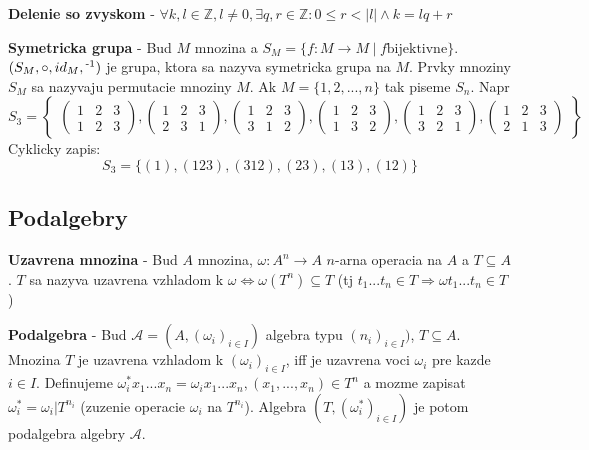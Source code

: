 \documentclass[12pt]{article}
\newcommand{\pipesep}{\hspace{3pt} \vert \hspace{3pt}}
\begin{document}
\textbf{Delenie so zvyskom} - $\forall k,l \in \mathbb{Z}, l \not= 0, \exists q,r \in \mathbb{Z}:
0 \le r < \vert l \vert \land k = lq + r$

\textbf{Symetricka grupa} - Bud $M$ mnozina a $S_{M} = \{ f : M \to M \pipesep f \text{bijektivne} \}$.
$(S_{M}, \circ, id_{M}, \textsuperscript{-1})$ je grupa, ktora sa nazyva symetricka grupa na $M$.
Prvky mnoziny $S_{M}$ sa nazyvaju permutacie mnoziny $M$. Ak $M = \{1,2,...,n\}$ tak piseme $S_{n}$. Napr
\begin{equation*}
	S_{3} = \begin{Bmatrix}
	\begin{pmatrix}
		1 & 2 & 3 \\
		1 & 2 & 3
	\end{pmatrix},
	\begin{pmatrix}
		1 & 2 & 3 \\
		2 & 3 & 1
	\end{pmatrix},
	\begin{pmatrix}
		1 & 2 & 3 \\
		3 & 1 & 2
	\end{pmatrix},
	\begin{pmatrix}
		1 & 2 & 3 \\
		1 & 3 & 2
	\end{pmatrix},
	\begin{pmatrix}
		1 & 2 & 3 \\
		3 & 2 & 1
	\end{pmatrix},
	\begin{pmatrix}
		1 & 2 & 3 \\
		2 & 1 & 3
	\end{pmatrix}
	\end{Bmatrix}
\end{equation*}
Cyklicky zapis:
\begin{equation*}
	S_{3} = \{ (1), (123), (312), (23), (13), (12) \}
\end{equation*}
\subsection{Podalgebry}
\textbf{Uzavrena mnozina} - Bud $A$ mnozina, $\omega: A^{n} \to A$ $n$-arna operacia na $A$ a $T \subseteq A$.
$T$ sa nazyva uzavrena vzhladom k $\omega \Leftrightarrow \omega(T^{n}) \subseteq T$
(tj $t_{1}...t_{n} \in T \Rightarrow \omega t_{1}...t_{n} \in T$)

\textbf{Podalgebra} - Bud $\mathcal{A} = (A,(\omega_{i})_{i \in I})$ algebra typu $(n_{i})_{i \in I})$, $T \subseteq A$.
Mnozina $T$ je uzavrena vzhladom k $(\omega_{i})_{i \in I}$, iff je uzavrena voci $\omega_{i}$ pre kazde $i \in I$.
Definujeme $\omega^{*}_{i}x_{1}...x_{n} = \omega_{i}x_{1}...x_{n}, (x_{1},...,x_{n}) \in T^{n}$ a mozme zapisat
$\omega^{*}_{i} = \omega_{i} \vert T^{n_{i}}$ (zuzenie operacie $\omega_{i}$ na $T^{n_{i}}$).
Algebra $(T,(\omega^{*}_{i})_{i \in I})$ je potom podalgebra algebry $\mathcal{A}$.
\end{document}
